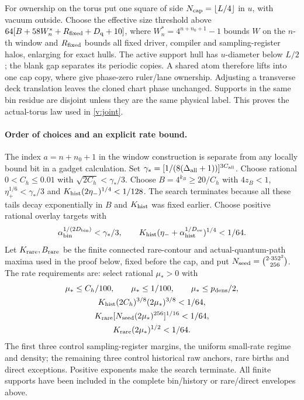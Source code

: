 For ownership on the torus put one square of side
\(N_{\rm cap}=\lfloor L/4\rfloor\) in \(u\), with vacuum outside.
Choose the effective size threshold above
\(64[B+58W_n^*+R_{\rm fixed}+D_{\rm q}+10]\), where
\(W_n^*=4^{n+n_0+1}-1\) bounds \(W\) on the \(n\)-th window and
\(R_{\rm fixed}\) bounds all fixed driver, compiler and sampling-register halos,
enlarging for exact hulls. The active support hull has \(u\)-diameter below \(L/2\);
the blank gap separates its periodic copies. A shared atom therefore
lifts into one cap copy, where \cite[Lemmas~6.1 and~10.4]{DMNoise2026}
give phase-zero ruler/lane ownership. Adjusting a transverse deck
translation leaves the cloned chart phase unchanged. Supports in the
same bin residue are disjoint unless they are the same physical label.
This proves the actual-torus law used in \eqref{v:joint}.

\paragraph{Order of choices and an explicit rate bound.}
The index \(a=n+n_0+1\) in the window construction is separate from
any locally bound bit in a gadget calculation.
Set
\(\gamma_*=[1/(8(\Delta_{\rm all}+1))]^{3C_{\rm all}}\).
Choose rational \(0<C_h\le0.01\) with \(\sqrt{2C_h}<\gamma_*/3\).
Choose \(B=4^{k_B}\ge20/C_h\) with \(4z_B<1\),
\(\eta_+^{1/6}<\gamma_*/3\) and
\(K_{\rm hist}(2\eta_-)^{1/4}<1/128\).
The search terminates because all these tails decay exponentially
in \(B\) and \(K_{\rm hist}\) was fixed earlier. Choose positive rational
overlay targets with
\[
 \alpha_{\rm bin}^{1/(2D_{\rm bin})}<\gamma_*/3,\qquad
 K_{\rm hist}(\eta_-+\alpha_{\rm hist}^{1/D_{\rm ov}})^{1/4}<1/64.
\]
Let \(K_{\rm rare},B_{\rm rare}\) be the finite connected rare-contour
and actual-quantum-path maxima used in the proof below, fixed before
the cap, and put \mbox{\(N_{\rm seed}=\tbinom{2\cdot352^2}{256}\)}.
The rate requirements are: select rational
\(\mu_*>0\) with
\begin{equation}\label{v:cap-list}
\begin{gathered}
 \mu_*\le C_h/100,\qquad \mu_*\le1/100,\qquad \mu_*\le p_{\rm dens}/2,\\
 K_{\rm hist}(2C_h)^{3/8}(2\mu_*)^{3/8}<1/64,\\
 K_{\rm rare}[N_{\rm seed}(2\mu_*)^{256}]^{1/16}<1/64,\\
 K_{\rm rare}(2\mu_*)^{1/2}<1/64.
\end{gathered}
\end{equation}
The first three control sampling-register margins, the uniform small-rate regime
and density; the remaining three control historical raw anchors, rare
births and direct exceptions. Positive exponents make the search
terminate. All finite supports have been included in the complete
bin/history or rare/direct envelopes above.

